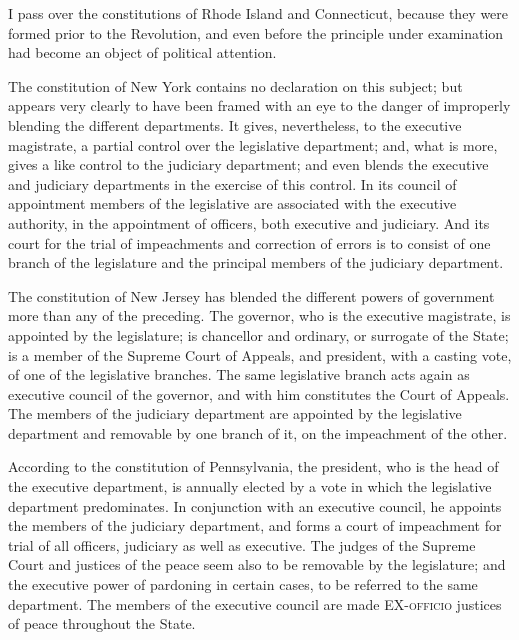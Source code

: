 I pass over the constitutions of Rhode Island and Connecticut, because they were formed prior to the Revolution, and even before the principle under examination had become an object of political attention.

The constitution of New York contains no declaration on this subject; but appears very clearly to have been framed with an eye to the danger of improperly blending the different departments. 
It gives, nevertheless, to the executive magistrate, a partial control over the legislative department; and, what is more, gives a like control to the judiciary department; and even blends the executive and judiciary departments in the exercise of this control. 
In its council of appointment members of the legislative are associated with the executive authority, in the appointment of officers, both executive and judiciary. 
And its court for the trial of impeachments and correction of errors is to consist of one branch of the legislature and the principal members of the judiciary department.

The constitution of New Jersey has blended the different powers of government more than any of the preceding. 
The governor, who is the executive magistrate, is appointed by the legislature; is chancellor and ordinary, or surrogate of the State; is a member of the Supreme Court of Appeals, and president, with a casting vote, of one of the legislative branches. 
The same legislative branch acts again as executive council of the governor, and with him constitutes the Court of Appeals. 
The members of the judiciary department are appointed by the legislative department and removable by one branch of it, on the impeachment of the other.

According to the constitution of Pennsylvania, the president, who is the head of the executive department, is annually elected by a vote in which the legislative department predominates. 
In conjunction with an executive council, he appoints the members of the judiciary department, and forms a court of impeachment for trial of all officers, judiciary as well as executive. 
The judges of the Supreme Court and justices of the peace seem also to be removable by the legislature; and the executive power of pardoning in certain cases, to be referred to the same department. 
The members of the executive council are made EX-\textsc{officio} justices of peace throughout the State.

